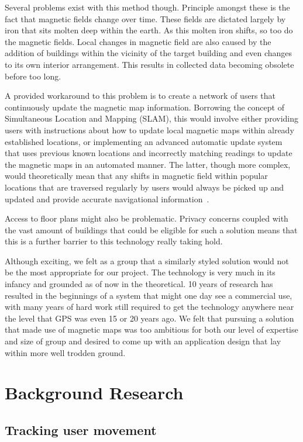 \documentclass[12pt,a4paper]{report}
\begin{document}
Several problems exist with this method though. Principle amongst these is the fact that magnetic fields change over time. These fields are dictated largely by iron that sits molten deep within the earth. As this molten iron shifts, so too do the magnetic fields. Local changes in magnetic field are also caused by the addition of buildings within the vicinity of the target building and even changes to its own interior arrangement. This results in collected data becoming obsolete before too long.
 
 A provided workaround to this problem is to create a network of users that continuously update the magnetic map information. Borrowing the concept of Simultaneous Location and Mapping (SLAM), this would involve either providing users with instructions about how to update local magnetic maps within already established locations, or implementing an advanced automatic update system that uses previous known locations and incorrectly matching readings to update the magnetic maps in an automated manner. The latter, though more complex, would theoretically mean that any shifts in magnetic field within popular locations that are traversed regularly by users would always be picked up and updated and provide accurate navigational information~\cite{IAReport}.
 
 Access to floor plans might also be problematic. Privacy concerns coupled with the vast amount of buildings that could be eligible for such a solution means that this is a further barrier to this technology really taking hold.
 
Although exciting, we felt as a group that a similarly styled solution would not be the most appropriate for our project. The technology is very much in its infancy and grounded as of now in the theoretical. 10 years of research has resulted in the beginnings of a system that might one day see a commercial use, with many years of hard work still required to get the technology anywhere near the level that GPS was even 15 or 20 years ago. We felt that pursuing a solution that made use of magnetic maps was too ambitious for both our level of expertise and size of group and desired to come up with an application design that lay within more well trodden ground.

\chapter{Background Research}

 \section{Tracking user movement}
\end{document}
